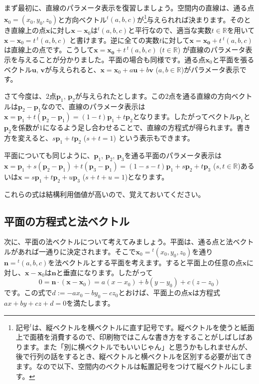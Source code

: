 まず最初に、直線のパラメータ表示を復習しましょう。空間内の直線は、通る点$\bm{x}_0 = (x_0, y_0, z_0)$と方向ベクトル${}^t(a,b,c)$が\footnote{記号${}^t$は、縦ベクトルを横ベクトルに直す記号です。縦ベクトルを使うと紙面上で面積を消費するので、印刷物ではこんな書き方をすることがしばしばあります。また「別に横ベクトルでもいいじゃん」と思うかもしれませんが、後で行列の話をするとき、縦ベクトルと横ベクトルを区別する必要が出てきます。なので以下、空間内のベクトルは転置記号をつけて縦ベクトルにします。}与えられれば決まります。そのとき直線上の点$\bm{x}$に対し$\bm{x} - \bm{x}_0$は${}^t(a,b,c)$と平行なので、適当な実数$t\in\mathbb{R}$を用いて$\bm{x} - \bm{x}_0 = t\,{}^t(a,b,c)$ と書けます。逆に全ての実数$t$に対して$\bm{x}=\bm{x_0} + t\,{}^t(a,b,c)$は直線上の点です。こうして$\bm{x}=\bm{x_0} + t\,{}^t(a,b,c)$ ($t\in\mathbb{R}$) が直線のパラメータ表示を与えることが分かりました。平面の場合も同様です。通る点$\bm{x}_0$と平面を張るベクトル$\bm{u}$, $\bm{v}$が与えられると、$\bm{x} = \bm{x}_0 + a \bm{u} + b \bm{v}$ ($a,b\in\mathbb{R}$)がパラメータ表示です。

さて今度は、$2$点$\bm{p}_1$, $\bm{p}_2$が与えられたとします。この$2$点を通る直線の方向ベクトルは$\bm{p}_2 - \bm{p}_1$なので、直線のパラメータ表示は$\bm{x} = \bm{p}_1 + t(\bm{p}_2 - \bm{p}_1) = (1-t) \bm{p}_1 + t\bm{p}_2$となります。したがってベクトル$\bm{p}_1$と$\bm{p}_2$を係数が$1$になるよう足し合わせることで、直線の方程式が得られます。書き方を変えると、$s\bm{p}_1+t\bm{p}_2$ ($s + t = 1$) という表示もできます。

平面についても同じように、$\bm{p}_1$,  $\bm{p}_2$, $\bm{p}_3$を通る平面のパラメータ表示は$\bm{x} = \bm{p}_1 + s (\bm{p}_2 - \bm{p}_1) + t (\bm{p}_3 - \bm{p}_1) = (1-s-t) \bm{p}_1 + s \bm{p}_2 + t \bm{p}_3 $ ($s,t\in\mathbb{R}$)あるいは$\bm{x} = s \bm{p}_1 + t \bm{p}_2 + u \bm{p}_3$ ($s + t + u = 1$)となります。

これらの式は結構利用価値が高いので、覚えておいてください。

\subsection{平面の方程式と法ベクトル}

次に、平面の法ベクトルについて考えてみましょう。平面は、通る点と法ベクトルがあれば一通りに決定されます。そこで$\bm{x}_0={}^t(x_0, y_0, z_0)$を通り$\bm{n}={}^t(a,b,c)$を法ベクトルとする平面を考えます。すると平面上の任意の点$\bm{x}$に対し、$\bm{x}-\bm{x}_0$は$\bm{n}$と垂直になります。したがって
\[
0 = \bm{n} \cdot (\bm{x}-\bm{x}_0) = a(x - x_0) + b(y - y_0) + c(z - z_0)
\]
です。この式で$d := -a x_0 - b y_0 - c z_0$とおけば、平面上の点$\bm{x}$は方程式$ax+by+cz+d=0$を満たします。

